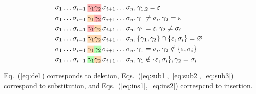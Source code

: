 \documentclass[sigplan,nonacm,anonymous]{acmart}\settopmatter{printfolios=false,printccs=false,printacmref=false}
\begin{document}
  \begin{align}
    &\sigma_{1}\ldots\sigma_{i-1}\:\text{\hlred{$\gamma_1$}\hlred{$\gamma_2$}}\:\sigma_{i+1}\ldots\sigma_{n}, \gamma_{1, 2} = \varepsilon\label{eq:del}\\
    &\sigma_{1}\ldots \sigma_{i-1}\:\text{\hlorange{$\gamma_1$}\hlred{$\gamma_2$}}\:\sigma_{i+1}\ldots \sigma_{n}, \gamma_1 \neq \sigma_i, \gamma_2 = \varepsilon\label{eq:sub1}\\
    &\sigma_{1}\ldots \sigma_{i-1}\:\text{\hlred{$\gamma_1$}\hlorange{$\gamma_2$}}\:\sigma_{i+1}\ldots \sigma_{n}, \gamma_1 = \varepsilon, \gamma_2 \neq \sigma_i\label{eq:sub2}\\
    &\sigma_{1}\ldots\sigma_{i-1}\: \text{\hlorange{$\gamma_1\gamma_2$}}\:\sigma_{i+1}\ldots\sigma_{n}, \{\gamma_1, \gamma_2\}\cap\{\varepsilon, \sigma_i\} = \varnothing \label{eq:sub3}\\
    &\sigma_{1}\ldots\sigma_{i-1}\: \text{\hlorange{$\gamma_1$}\hlgreen{$\gamma_2$}}\:\sigma_{i+1}\ldots\sigma_{n}, \gamma_1 = \sigma_i, \gamma_2 \notin \{\varepsilon, \sigma_i\}\label{eq:ins1}\\
    &\sigma_{1}\ldots\sigma_{i-1}\: \text{\hlgreen{$\gamma_1$}\hlorange{$\gamma_2$}}\:\sigma_{i+1}\ldots\sigma_{n}, \gamma_1 \notin \{\varepsilon, \sigma_i\}, \gamma_2 = \sigma_i\label{eq:ins2}
  \end{align}

  \noindent Eq.~(\ref{eq:del}) corresponds to deletion, Eqs.~(\ref{eq:sub1},~\ref{eq:sub2},~\ref{eq:sub3}) correspond to substitution, and Eqs.~(\ref{eq:ins1},~\ref{eq:ins2}) correspond to insertion.

%
%
\end{document}
